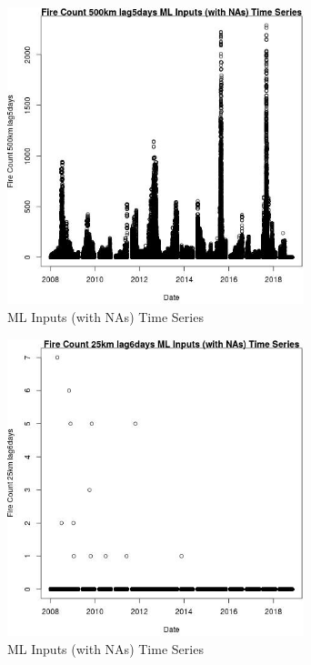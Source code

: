 \begin{figure} 
\centering  
\includegraphics[width=0.77\textwidth]{Code_Outputs/Report_ML_input_PM25_Step4_part_e_de_duplicated_aves_compiled_2019-05-20wNAs_Fire_Count_500km_lag5daysvDate.jpg} 
\caption{\label{fig:Report_ML_input_PM25_Step4_part_e_de_duplicated_aves_compiled_2019-05-20wNAsFire_Count_500km_lag5daysvDate}ML Inputs (with NAs) Time Series} 
\end{figure} 
 

\begin{figure} 
\centering  
\includegraphics[width=0.77\textwidth]{Code_Outputs/Report_ML_input_PM25_Step4_part_e_de_duplicated_aves_compiled_2019-05-20wNAs_Fire_Count_25km_lag6daysvDate.jpg} 
\caption{\label{fig:Report_ML_input_PM25_Step4_part_e_de_duplicated_aves_compiled_2019-05-20wNAsFire_Count_25km_lag6daysvDate}ML Inputs (with NAs) Time Series} 
\end{figure} 
 

